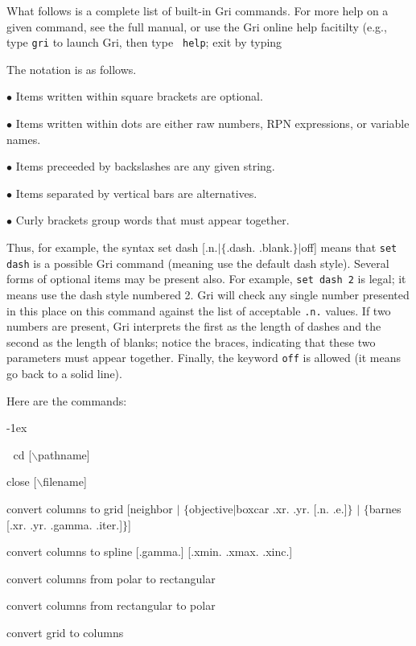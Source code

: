 What follows is a complete list of built-in Gri commands.  For more
help on a given command, see the full manual, or use the Gri online
help facitilty (e.g., type {\tt gri} to launch Gri, then type {\tt
help}; exit by typing

The notation is as follows.  

$\bullet$ Items written within square brackets are optional.

$\bullet$ Items written within dots are either raw numbers, RPN
expressions, or variable names.

$\bullet$ Items preceeded by backslashes are any given string.

$\bullet$ Items separated by vertical bars are alternatives.

$\bullet$ Curly brackets group words that must appear together.

Thus, for example, the syntax
\beginexample
    set dash [.n.$\mid$$\lbrace$.dash. .blank.$\rbrace$$\mid$off]
\endexample
means that {\tt set dash} is a possible Gri command (meaning use the
default dash style).  Several forms of optional items may be present
also.  For example, {\tt set dash 2} is legal; it means use the dash
style numbered 2.  Gri will check any single number presented in this
place on this command against the list of acceptable {\tt .n.} values.
If two numbers are present, Gri interprets the first as the length of
dashes and the second as the length of blanks; notice the braces,
indicating that these two parameters must appear together.  Finally,
the keyword {\tt off} is allowed (it means go back to a solid line).


\bigskip
Here are the commands:
\smallskip

\parindent -1ex

\beginexample


cd [$\backslash$pathname]

close [$\backslash$filename]

convert columns to grid [neighbor $\mid$ $\lbrace$objective$\mid$boxcar .xr. .yr. [.n. .e.]$\rbrace$ $\mid$ $\lbrace$barnes [.xr. .yr. .gamma. .iter.]$\rbrace$]

convert columns to spline [.gamma.] [.xmin. .xmax. .xinc.]

convert columns from polar to rectangular

convert columns from rectangular to polar

convert grid to columns

